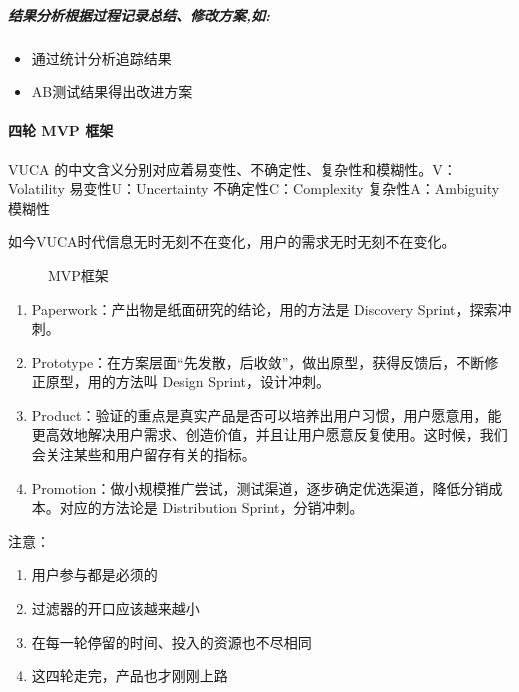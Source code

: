 \documentclass[letterpaper,10pt,english]{sphinxmanual}
\begin{document}
\subparagraph{结果分析根据过程记录总结、修改方案,如:}
\label{\detokenize{chapter_knowledge/BRD:id15}}\begin{itemize}
\item {} 
通过统计分析追踪结果

\item {} 
AB测试结果得出改进方案

\end{itemize}


\paragraph{四轮 MVP 框架}
\label{\detokenize{chapter_knowledge/BRD:mvp}}
VUCA 的中文含义分别对应着易变性、不确定性、复杂性和模糊性。V：Volatility
易变性U：Uncertainty 不确定性C：Complexity 复杂性A：Ambiguity 模糊性

如今VUCA时代信息无时无刻不在变化，用户的需求无时无刻不在变化。

\begin{figure}[H]
\centering
\capstart

\noindent{}
\caption{MVP框架}\label{\detokenize{chapter_knowledge/BRD:id21}}\end{figure}
\begin{enumerate}
%
\item {} 
Paperwork：产出物是纸面研究的结论，用的方法是 Discovery
Sprint，探索冲刺。

\item {} 
Prototype：在方案层面“先发散，后收敛”，做出原型，获得反馈后，不断修正原型，用的方法叫
Design Sprint，设计冲刺。

\item {} 
Product：验证的重点是真实产品是否可以培养出用户习惯，用户愿意用，能更高效地解决用户需求、创造价值，并且让用户愿意反复使用。这时候，我们会关注某些和用户留存有关的指标。

\item {} 
Promotion：做小规模推广尝试，测试渠道，逐步确定优选渠道，降低分销成本。对应的方法论是
Distribution Sprint，分销冲刺。

\end{enumerate}

注意：
\begin{enumerate}
%
\item {} 
用户参与都是必须的

\item {} 
过滤器的开口应该越来越小

\item {} 
在每一轮停留的时间、投入的资源也不尽相同

\item {} 
这四轮走完，产品也才刚刚上路

\end{enumerate}
\end{document}
